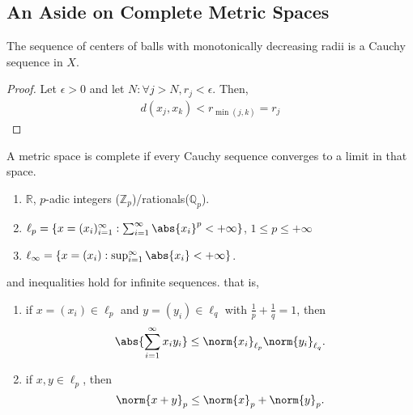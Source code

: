 \subsection{An Aside on Complete Metric Spaces}
\begin{theorem}
    The sequence of centers of balls with monotonically decreasing radii is a Cauchy sequence in $X$.
\end{theorem}

\begin{proof}
    Let $\epsilon > 0$ and let $N : \forall j > N, r_j < \epsilon$. Then, 
    \begin{align*}
        d(x_j, x_k) < r_{\min(j, k)} = r_j
    \end{align*}
\end{proof}

\begin{definition}
    A metric space is complete if every Cauchy sequence converges to a limit in that space.
\end{definition}

\begin{example}
    \begin{enumerate}
        \item $\mathbb{R}$, $p$-adic integers ($\mathbb{Z}_p$)/rationals($\mathbb{Q}_p$).
        \item $\ell_p = \{x = (x_i)_{i=1}^\infty : \sum_{i = 1}^\infty \abs{x_i}^p < + \infty\}$, $1 \leq p \leq + \infty$
        \item $\ell_\infty = \{x = (x_i) : \sup_{i  =1}^\infty \abs{x_i} < + \infty\}$.
    \end{enumerate}
\end{example}

\begin{proposition}
     and  inequalities hold for infinite sequences. that is,
    \begin{enumerate}
        \item if $x=(x_i) \in \ell_p$ and $y=(y_i) \in \ell_q$ with $\frac{1}{p} + \frac{1}{q} = 1$, then \[
    \abs{\sum_{i=1}^\infty x_i y_i} \leq \norm{x_i}_{\ell_p}\norm{y_i}_{\ell_q}.
    \]
    \item if $x, y \in \ell_p$, then \[
        \norm{x + y}_p \leq \norm{x}_p + \norm{y}_p.    
    \]
    \end{enumerate}
\end{proposition}

